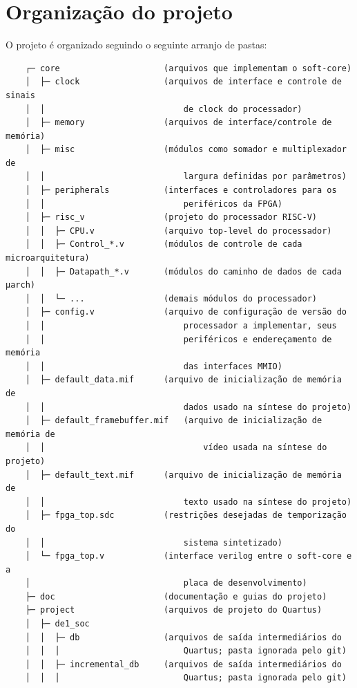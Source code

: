 \section{Organização do projeto}
{ O projeto é organizado seguindo o seguinte arranjo de pastas:
\begin{verbatim}
    ┌─ core                     (arquivos que implementam o soft-core)
    │  ├─ clock                 (arquivos de interface e controle de sinais
    │  │                            de clock do processador)
    │  ├─ memory                (arquivos de interface/controle de memória)
    │  ├─ misc                  (módulos como somador e multiplexador de
    │  │                            largura definidas por parâmetros)
    │  ├─ peripherals           (interfaces e controladores para os
    │  │                            periféricos da FPGA)
    │  ├─ risc_v                (projeto do processador RISC-V)
    │  │  ├─ CPU.v              (arquivo top-level do processador)
    │  │  ├─ Control_*.v        (módulos de controle de cada microarquitetura)
    │  │  ├─ Datapath_*.v       (módulos do caminho de dados de cada µarch)
    │  │  └─ ...                (demais módulos do processador)
    │  ├─ config.v              (arquivo de configuração de versão do
    │  │                            processador a implementar, seus
    │  │                            periféricos e endereçamento de memória
    │  │                            das interfaces MMIO)
    │  ├─ default_data.mif      (arquivo de inicialização de memória de
    │  │                            dados usado na síntese do projeto)
    │  ├─ default_framebuffer.mif   (arquivo de inicialização de memória de
    │  │                                vídeo usada na síntese do projeto)
    │  ├─ default_text.mif      (arquivo de inicialização de memória de
    │  │                            texto usado na síntese do projeto)
    │  ├─ fpga_top.sdc          (restrições desejadas de temporização do
    │  │                            sistema sintetizado)
    │  └─ fpga_top.v            (interface verilog entre o soft-core e a
    │                               placa de desenvolvimento)
    ├─ doc                      (documentação e guias do projeto)
    ├─ project                  (arquivos de projeto do Quartus)
    │  ├─ de1_soc
    │  │  ├─ db                 (arquivos de saída intermediários do
    │  │  │                         Quartus; pasta ignorada pelo git)
    │  │  ├─ incremental_db     (arquivos de saída intermediários do
    │  │  │                         Quartus; pasta ignorada pelo git)

\end{verbatim}}

